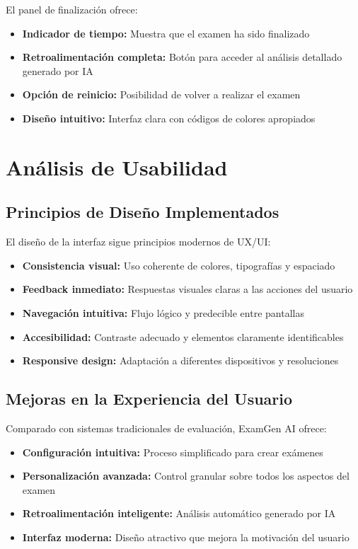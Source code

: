 \documentclass[12pt,a4paper]{report}
\begin{document}
El panel de finalización ofrece:
\begin{itemize}
\item \textbf{Indicador de tiempo:} Muestra que el examen ha sido finalizado
\item \textbf{Retroalimentación completa:} Botón para acceder al análisis detallado generado por IA
\item \textbf{Opción de reinicio:} Posibilidad de volver a realizar el examen
\item \textbf{Diseño intuitivo:} Interfaz clara con códigos de colores apropiados
\end{itemize}

\section{Análisis de Usabilidad}

\subsection{Principios de Diseño Implementados}

El diseño de la interfaz sigue principios modernos de UX/UI:

\begin{itemize}
\item \textbf{Consistencia visual:} Uso coherente de colores, tipografías y espaciado
\item \textbf{Feedback inmediato:} Respuestas visuales claras a las acciones del usuario
\item \textbf{Navegación intuitiva:} Flujo lógico y predecible entre pantallas
\item \textbf{Accesibilidad:} Contraste adecuado y elementos claramente identificables
\item \textbf{Responsive design:} Adaptación a diferentes dispositivos y resoluciones
\end{itemize}

\subsection{Mejoras en la Experiencia del Usuario}

Comparado con sistemas tradicionales de evaluación, ExamGen AI ofrece:

\begin{itemize}
\item \textbf{Configuración intuitiva:} Proceso simplificado para crear exámenes
\item \textbf{Personalización avanzada:} Control granular sobre todos los aspectos del examen
\item \textbf{Retroalimentación inteligente:} Análisis automático generado por IA
\item \textbf{Interfaz moderna:} Diseño atractivo que mejora la motivación del usuario
\end{itemize}
\end{document}
